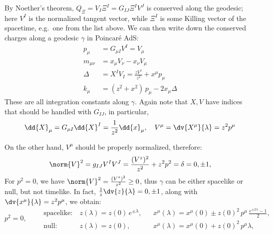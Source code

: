 \documentclass[a4paper,10pt]{article}
\begin{document}
	By Noether's theorem, $Q_\Xi = V_I \Xi^I = G_{IJ} \Xi^I V^J$ is conserved along the geodesic; here $V^I$ is the normalized tangent vector, while $\Xi^I$ is some Killing vector of the spacetime, e.g.~one from the list above. 
	We can then write down the conserved charges along a geodesic $\gamma$ in Poincar\'e AdS:
	\begin{equation}
	\begin{aligned}
		p_\mu
			&= G_{\mu I} V^I = V_\mu \\
		m_{\mu\nu}
			&= x_\mu V_\nu - x_\nu V_\mu \\
		\Delta
			&= X^I V_I
			= \frac{z V^z}{z^2} + x^\mu p_\mu
		\\
		k_\mu &= (z^2 + x^2)\, p_\mu - 2x_\mu \Delta
	\end{aligned}
	\end{equation}
	These are all integration constants along $\gamma$. 
	Again note that $X,V$ have indices that should be handled with $G_{IJ}$, in particular,
	\begin{equation}
		\dd{X}_\mu
		= G_{\mu I} \dd{X}^I
		= \frac{1}{z^2} \dd{x}_\mu,
	\quad
		V^\mu = \dv{X^\mu}{\lambda} = z^2 p^\mu
	\label{eq:p_conserved}
	\end{equation}
	
	On the other hand, $V^\mu$ should be properly normalized, therefore:
	\begin{equation}
	\begin{gathered}
		\norm{V}^2
		= g_{IJ} V^I V^J
		= \frac{(V^z)^2}{z^2} + z^2 p^2
		= \delta = 0,\pm 1,
	\label{eq:tangent_norm}
	\end{gathered}
	\end{equation}
	For $p^2 = 0$, we have $
		\norm{V}^2
		= \frac{(V^z)^2}{z^2}
		\ge 0
	$, thus $\gamma$ can be either spacelike or null, but not timelike. In fact, $
		\frac{1}{z}\dv{z}{\lambda} = 0,\pm 1
	$, along with $\dv{x^\mu}{\lambda} = z^2 p^\mu$, we obtain:
	\begin{equation}
	p^2 = 0,\qquad
	\begin{aligned}
		\text{spacelike}\colon\ &
			z(\lambda)
			= z(0)\,e^{\pm\lambda},
		&&
			x^\mu(\lambda)
			= x^\mu(0) \pm z(0)^2\,p^\mu\,
				\tfrac{
					e^{\pm 2\lambda} - 1
				}{2}, \\
		\text{null}\colon\ &
			z(\lambda)
			= z(0),
		&&
			x^\mu(\lambda)
			= x^\mu(0) + z(0)^2\,p^\mu \lambda,
	\end{aligned}
	\label{eq:null_type}
	\end{equation}
	
\end{document}
